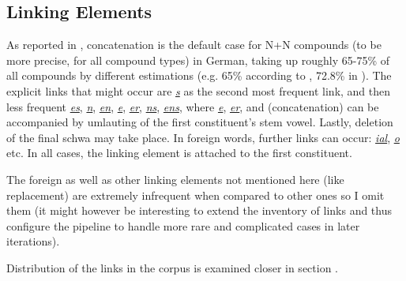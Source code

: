 \documentclass[11pt]{article}
\begin{document}
\subsection{Linking Elements}
\label{subsec:links}

As reported in \citet[226-228]{eisenberg2016grundriss}, concatenation \textit{\underline{ }} is the default case for N+N compounds (to be more precise, for all compound types) in German, taking up roughly 65-75\% of all compounds by different estimations (e.g. 65\% according to \citealt{Krott2007}, 72.8\% in \citealt[54]{OrtnerMullerBollhagen+1991}). The explicit links that might occur are \textit{\underline{s}} as the second most frequent link, and then less frequent \textit{\underline{es}}, \textit{\underline{n}}, \textit{\underline{en}}, \textit{\underline{e}}, \textit{\underline{er}}, \textit{\underline{ns}}, \textit{\underline{ens}}, where \textit{\underline{e}}, \textit{\underline{er}}, and \textit{\underline{ }} (concatenation) can be accompanied by umlauting of the first constituent's stem vowel. Lastly, deletion of the final schwa may take place. In foreign words, further links can occur: \textit{\underline{ial}}, \textit{\underline{o}} etc. In all cases, the linking element is attached to the first constituent. 

The foreign as well as other linking elements not mentioned here (like replacement) are extremely infrequent when compared to other ones so I omit them (it might however be interesting to extend the inventory of links and thus configure the pipeline to handle more rare and complicated cases in later iterations).


Distribution of the links in the corpus is examined closer in section .
\end{document}
